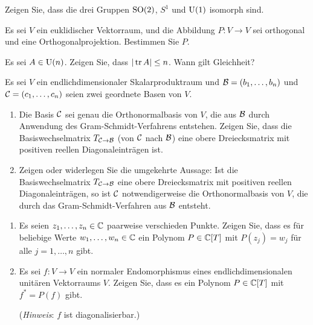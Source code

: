\documentclass[a4paper,10pt]{scrartcl}
\begin{document}
\begin{question}
  Zeigen Sie, dass die drei Gruppen $\operatorname{SO}(2)$, $S^1$ und $\operatorname{U}(1)$ isomorph sind.
\end{question}


\begin{question}
  Es sei $V$ ein euklidischer Vektorraum, und die Abbildung $P \colon V \to V$ sei orthogonal und eine Orthogonalprojektion.
  Bestimmen Sie $P$.
\end{question}


\begin{question}
  Es sei $A \in \operatorname{U}(n)$.
  Zeigen Sie, dass $|\operatorname{tr} A| \leq n$.
  Wann gilt Gleichheit?
\end{question}


\begin{question}
  Es sei $V$ ein endlichdimensionaler Skalarproduktraum und $\mathcal{B} = (b_1, \dotsc, b_n)$ und $\mathcal{C} = (c_1, \dotsc, c_n)$ seien zwei geordnete Basen von $V$.
  \begin{enumerate}
    \item
      Die Basis $\mathcal{C}$ sei genau die Orthonormalbasis von $V$, die aus $\mathcal{B}$ durch Anwendung des Gram-Schmidt-Verfahrens entstehen.
      Zeigen Sie, dass die Basiswechselmatrix $T_{\mathcal{C} \to \mathcal{B}}$ (von $\mathcal{C}$ nach $\mathcal{B}$) eine obere Dreiecksmatrix mit positiven reellen Diagonaleinträgen ist.
    \item
      Zeigen oder widerlegen Sie die umgekehrte Aussage:
      Ist die Basiswechselmatrix $T_{\mathcal{C} \to \mathcal{B}}$ eine obere Dreiecksmatrix mit positiven reellen Diagonaleinträgen, so ist $\mathcal{C}$ notwendigerweise die Orthonormalbasis von $V$, die durch das Gram-Schmidt-Verfahren aus $\mathcal{B}$ entsteht.
  \end{enumerate}
\end{question}


\begin{question}
  \begin{enumerate}[leftmargin=*]
    \item
      Es seien $z_1, \dotsc, z_n \in \mathbb{C}$ paarweise verschieden Punkte.
      Zeigen Sie, dass es für beliebige Werte $w_1, \dotsc, w_n \in \mathbb{C}$ ein Polynom $P \in \mathbb{C}[T]$ mit $P(z_j) = w_j$ für alle $j = 1, \dotsc, n$ gibt.
    \item
      Es sei $f \colon V \to V$ ein normaler Endomorphismus eines endlichdimensionalen unitären Vektorraums $V$.
      Zeigen Sie, dass es ein Polynom $P \in \mathbb{C}[T]$ mit $f^* = P(f)$ gibt.
      
      (\emph{Hinweis}:
       $f$ ist diagonalisierbar.)
  \end{enumerate}
\end{question}
\end{document}
